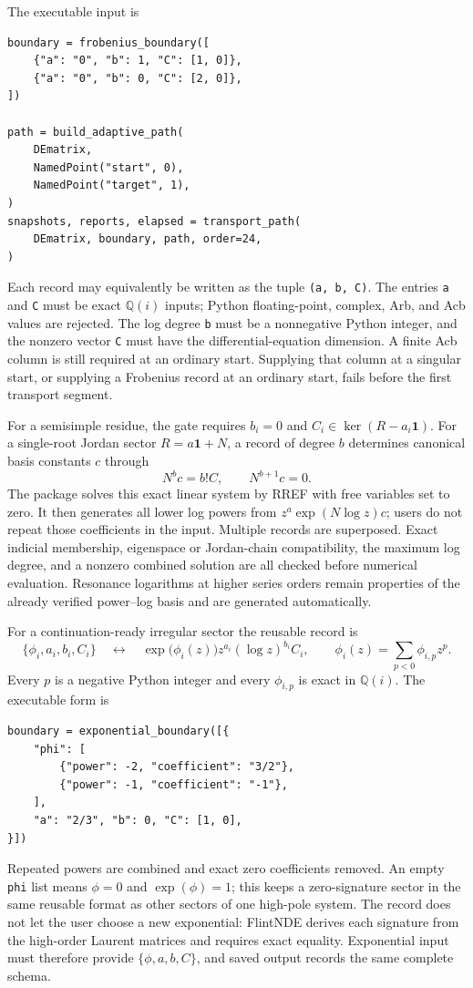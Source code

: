 \documentclass[11pt]{article}
\newcommand{\Id}{\mathbf 1}
\begin{document}
The executable input is
\begin{verbatim}
boundary = frobenius_boundary([
    {"a": "0", "b": 1, "C": [1, 0]},
    {"a": "0", "b": 0, "C": [2, 0]},
])

path = build_adaptive_path(
    DEmatrix,
    NamedPoint("start", 0),
    NamedPoint("target", 1),
)
snapshots, reports, elapsed = transport_path(
    DEmatrix, boundary, path, order=24,
)
\end{verbatim}
Each record may equivalently be written as the tuple \texttt{(a, b, C)}.  The entries
\texttt{a} and \texttt{C} must be exact $\mathbb Q(i)$ inputs; Python floating-point,
complex, Arb, and Acb values are rejected.  The log degree \texttt{b} must be a nonnegative
Python integer, and the nonzero vector \texttt{C} must have the differential-equation
dimension.  A finite Acb column is still required at an ordinary start.  Supplying that
column at a singular start, or supplying a Frobenius record at an ordinary start, fails
before the first transport segment.

For a semisimple residue, the gate requires $b_i=0$ and
$C_i\in\ker(R-a_i\Id)$.  For a single-root Jordan sector
$R=a\Id+N$, a record of degree $b$ determines canonical basis constants $c$ through
\begin{equation}
  N^b c=b!C,
  \qquad N^{b+1}c=0.
  \label{eq:frobenius-boundary-jordan-recovery}
\end{equation}
The package solves this exact linear system by RREF with free variables set to zero.  It
then generates all lower log powers from $z^a\exp(N\log z)c$; users do not repeat those
coefficients in the input.  Multiple records are superposed.  Exact indicial membership,
eigenspace or Jordan-chain compatibility, the maximum log degree, and a nonzero combined
solution are all checked before numerical evaluation.  Resonance logarithms at higher
series orders remain properties of the already verified power--log basis and are generated
automatically.

For a continuation-ready irregular sector the reusable record is
\begin{equation}
  \bigl\{\phi_i,a_i,b_i,C_i\bigr\}
  \quad\longleftrightarrow\quad
  \exp\!\bigl(\phi_i(z)\bigr)z^{a_i}(\log z)^{b_i}C_i,
  \qquad
  \phi_i(z)=\sum_{p<0}\phi_{i,p}z^p .
  \label{eq:exponential-boundary-record}
\end{equation}
Every $p$ is a negative Python integer and every $\phi_{i,p}$ is exact in
$\mathbb Q(i)$.  The executable form is
\begin{verbatim}
boundary = exponential_boundary([{
    "phi": [
        {"power": -2, "coefficient": "3/2"},
        {"power": -1, "coefficient": "-1"},
    ],
    "a": "2/3", "b": 0, "C": [1, 0],
}])
\end{verbatim}
Repeated powers are combined and exact zero coefficients removed.  An empty
\texttt{phi} list means $\phi=0$ and $\exp(\phi)=1$; this keeps a zero-signature sector in
the same reusable format as other sectors of one high-pole system.  The record does not let
the user choose a new exponential: FlintNDE derives each signature from the high-order
Laurent matrices and requires exact equality.  Exponential input must therefore provide
$\{\phi,a,b,C\}$, and saved output records the same complete schema.
\end{document}
